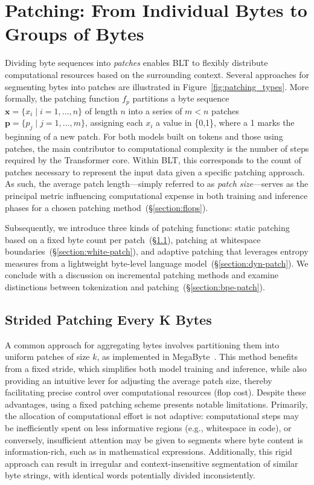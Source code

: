 \section{Patching: From Individual Bytes to Groups of Bytes}
\label{section:patching}

Dividing byte sequences into \textit{patches} enables {\textsc BLT} to flexibly distribute computational resources based on the surrounding context. Several approaches for segmenting bytes into patches are illustrated in Figure~\ref{fig:patching_types}. More formally, the patching function $f_p$ partitions a byte sequence $\pmb{x} = \{x_i \mid i=1, \ldots, n\}$ of length $n$ into a series of $m < n$ patches $\pmb{p} = \{p_j \mid j=1, \ldots, m\}$, assigning each $x_i$ a value in \{0,1\}, where a 1 marks the beginning of a new patch. For both models built on tokens and those using patches, the main contributor to computational complexity is the number of steps required by the Transformer core. Within {\textsc BLT}, this corresponds to the count of patches necessary to represent the input data given a specific patching approach. As such, the average patch length—simply referred to as \textit{patch size}—serves as the principal metric influencing computational expense in both training and inference phases for a chosen patching method~(\S\ref{section:flops}).

Subsequently, we introduce three kinds of patching functions: static patching based on a fixed byte count per patch~(\S\ref{section:static-patch}), patching at whitespace boundaries~(\S\ref{section:white-patch}), and adaptive patching that leverages entropy measures from a lightweight byte-level language model~(\S\ref{section:dyn-patch}). We conclude with a discussion on incremental patching methods and examine distinctions between tokenization and patching~(\S\ref{section:bpe-patch}).

\subsection{Strided Patching Every K Bytes}
\label{section:static-patch}

A common approach for aggregating bytes involves partitioning them into uniform patches of size $k$, as implemented in MegaByte~\citep{yu2023megabyte}. This method benefits from a fixed stride, which simplifies both model training and inference, while also providing an intuitive lever for adjusting the average patch size, thereby facilitating precise control over computational resources (flop cost). Despite these advantages, using a fixed patching scheme presents notable limitations. Primarily, the allocation of computational effort is not adaptive: computational steps may be inefficiently spent on less informative regions (e.g., whitespace in code), or conversely, insufficient attention may be given to segments where byte content is information-rich, such as in mathematical expressions. Additionally, this rigid approach can result in irregular and context-insensitive segmentation of similar byte strings, with identical words potentially divided inconsistently.

